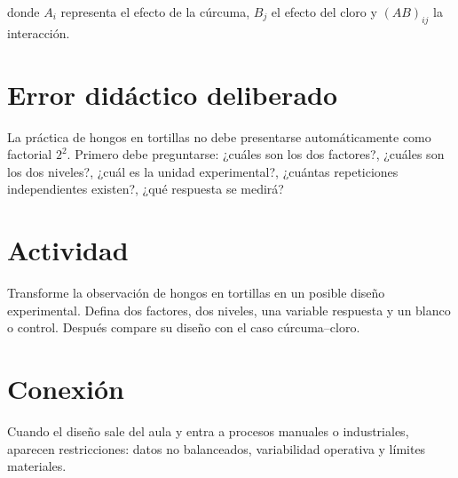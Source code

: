 donde \(A_i\) representa el efecto de la cúrcuma, \(B_j\) el efecto del cloro y \((AB)_{ij}\) la interacción.

\section{Error didáctico deliberado}

\begin{cuidado}
La práctica de hongos en tortillas no debe presentarse automáticamente como factorial \(2^2\). Primero debe preguntarse: ¿cuáles son los dos factores?, ¿cuáles son los dos niveles?, ¿cuál es la unidad experimental?, ¿cuántas repeticiones independientes existen?, ¿qué respuesta se medirá?
\end{cuidado}

\section{Actividad}

Transforme la observación de hongos en tortillas en un posible diseño experimental. Defina dos factores, dos niveles, una variable respuesta y un blanco o control. Después compare su diseño con el caso cúrcuma--cloro.

\section{Conexión}

Cuando el diseño sale del aula y entra a procesos manuales o industriales, aparecen restricciones: datos no balanceados, variabilidad operativa y límites materiales.
